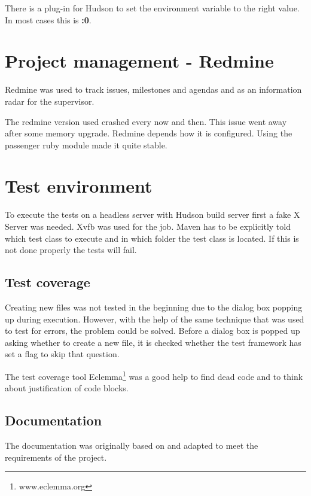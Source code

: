 There is a plug-in for Hudson to set the environment variable to
the right value. In most cases this is \textbf{:0}.

\section{Project management - Redmine}

Redmine was used to track issues, milestones and agendas and as an information 
radar for the supervisor.

The redmine version used crashed every now and then. This issue went away after
some memory upgrade. Redmine depends how it is configured. Using the passenger
ruby module made it quite stable. 

\section{Test environment}

To execute the tests on a headless server with Hudson build server first a fake
X Server was needed. Xvfb was used for the job. Maven has to be
explicitly told which test class to execute and in which folder the test class
is located. If this is not done properly the tests will fail.

\subsection{Test coverage}

Creating new files was not tested in the beginning due to the dialog box popping 
up during execution. However, with the help of the same technique that was used 
to test for errors, the problem could be solved. Before a dialog box is popped 
up asking whether to create a new file, it is checked whether the test framework 
has set a flag to skip that question.

The test coverage tool Eclemma\footnote{www.eclemma.org} was a good help to find 
dead code and to think about justification of code blocks. 

\subsection{Documentation}

The documentation was originally based on \cite{AV08} and adapted to meet the 
requirements of the project.
